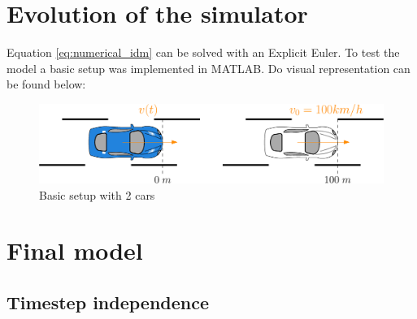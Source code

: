 \documentclass[a4paper,11pt,twoside]{report}
\begin{document}
	\chapter{Evolution of the simulator}
			Equation \ref{eq:numerical_idm} can be solved with an Explicit Euler. To test the model a basic setup was implemented in MATLAB. Do visual representation can be found below:
			\begin{figure}[ht]
				\centering
				\includegraphics[width=\textwidth]{basic_2_car.eps}
				\caption{Basic setup with 2 cars}
				\label{fig:basic2car}
			\end{figure}
	\chapter{Final model}
		\section{Timestep independence}
\end{document}
